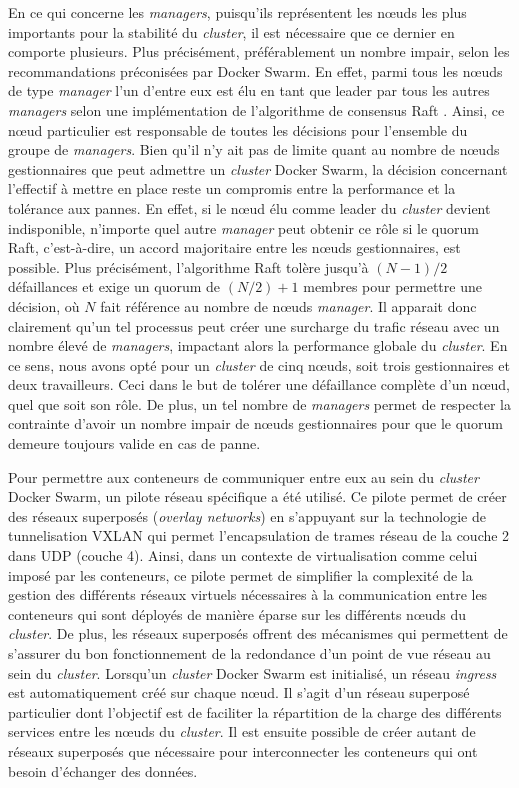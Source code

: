 En ce qui concerne les \textit{managers}, puisqu'ils représentent les n\oe{}uds les plus importants pour la stabilité du \textit{cluster}, il est nécessaire que ce dernier en comporte plusieurs. Plus précisément, préférablement un nombre impair, selon les recommandations préconisées par Docker Swarm. En effet, parmi tous les n\oe{}uds de type \textit{manager} l'un d'entre eux est élu en tant que leader par tous les autres \textit{managers} selon une implémentation de l'algorithme de consensus Raft \citep{MacKenzie2006}. Ainsi, ce n\oe{}ud particulier est responsable de toutes les décisions pour l'ensemble du groupe de \textit{managers}. Bien qu'il n'y ait pas de limite quant au nombre de n\oe{}uds gestionnaires que peut admettre un \textit{cluster} Docker Swarm, la décision concernant l'effectif à mettre en place reste un compromis entre la performance et la tolérance aux pannes. En effet, si le n\oe{}ud élu comme leader du \textit{cluster} devient indisponible, n'importe quel autre \textit{manager} peut obtenir ce rôle si le quorum Raft, c'est-à-dire, un accord majoritaire entre les n\oe{}uds gestionnaires, est possible. Plus précisément, l'algorithme Raft tolère jusqu'à $(N -1)/2$ défaillances et exige un quorum de $(N/2) + 1$ membres pour permettre une décision, où $N$ fait référence au nombre de n\oe{}uds \textit{manager}. Il apparait donc clairement qu'un tel processus peut créer une surcharge du trafic réseau avec un nombre élevé de \textit{managers}, impactant alors la performance globale du \textit{cluster}. En ce sens, nous avons opté pour un \textit{cluster} de cinq n\oe{}uds, soit trois gestionnaires et deux travailleurs. Ceci dans le but de tolérer une défaillance complète d'un n\oe{}ud, quel que soit son rôle. De plus, un tel nombre de \textit{managers} permet de respecter la contrainte d'avoir un nombre impair de n\oe{}uds gestionnaires pour que le quorum demeure toujours valide en cas de panne.

Pour permettre aux conteneurs de communiquer entre eux au sein du \textit{cluster} Docker Swarm, un pilote réseau spécifique a été utilisé. Ce pilote permet de créer des réseaux superposés (\textit{overlay networks}) en s'appuyant sur la technologie de tunnelisation \ac{VXLAN} \citep{rfc7348} qui permet l'encapsulation de trames réseau de la couche 2 dans \acs{UDP} (couche 4). Ainsi, dans un contexte de virtualisation comme celui imposé par les conteneurs, ce pilote permet de simplifier la complexité de la gestion des différents réseaux virtuels nécessaires à la communication entre les conteneurs qui sont déployés de manière éparse sur les différents n\oe{}uds du \textit{cluster}. De plus, les réseaux superposés offrent des mécanismes qui permettent de s'assurer du bon fonctionnement de la redondance d'un point de vue réseau au sein du \textit{cluster}. Lorsqu'un \textit{cluster} Docker Swarm est initialisé, un réseau \textit{ingress} est automatiquement créé sur chaque n\oe{}ud. Il s'agit d'un réseau superposé particulier dont l'objectif est de faciliter la répartition de la charge des différents services entre les n\oe{}uds du \textit{cluster}. Il est ensuite possible de créer autant de réseaux superposés que nécessaire pour interconnecter les conteneurs qui ont besoin d'échanger des données.

